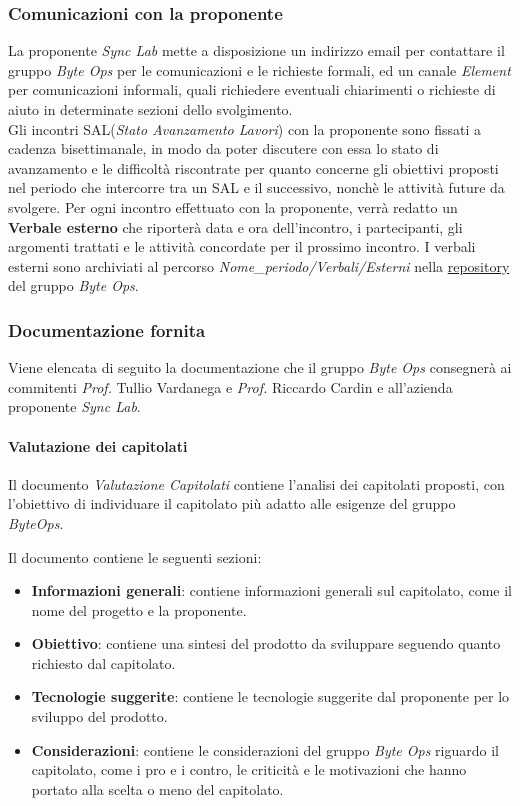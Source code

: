 \subsubsection{Comunicazioni con la proponente}
La proponente \textit{Sync Lab} mette a disposizione un indirizzo email per contattare il gruppo \textit{Byte Ops} per le comunicazioni e le richieste formali, ed un canale \textit{Element} per comunicazioni informali, quali richiedere eventuali chiarimenti o richieste di aiuto in determinate sezioni dello svolgimento.\\
Gli incontri SAL(\textit{Stato Avanzamento Lavori}) con la proponente sono fissati a cadenza bisettimanale, in modo da poter discutere con essa lo stato di avanzamento e le difficoltà riscontrate per quanto concerne gli obiettivi proposti nel periodo che intercorre tra un SAL e il successivo, nonchè le attività future da svolgere.
Per ogni incontro effettuato con la proponente, verrà redatto un \textbf{Verbale esterno} che riporterà data e ora dell'incontro, i partecipanti, gli argomenti trattati e le attività concordate per il prossimo incontro.
I verbali esterni sono archiviati al percorso \textit{Nome\_periodo/Verbali/Esterni} nella \href{https://github.com/ByteOps-swe/Documents}{repository} del gruppo \textit{Byte Ops}.

\subsubsection {Documentazione fornita}
Viene elencata di seguito la documentazione che il gruppo \textit{Byte Ops} consegnerà ai commitenti \textit{Prof.} Tullio Vardanega e \textit{Prof.} Riccardo Cardin e all'azienda proponente \textit{Sync Lab}.

\paragraph{Valutazione dei capitolati}
Il documento \textit{Valutazione Capitolati} contiene l'analisi dei capitolati proposti, con l'obiettivo di individuare il capitolato più adatto alle esigenze del gruppo \textit{ByteOps}.

Il documento contiene le seguenti sezioni:
\begin{itemize}
    \item \textbf{Informazioni generali}: contiene informazioni generali sul capitolato, come il nome del progetto e la proponente.
    \item \textbf{Obiettivo}: contiene una sintesi del prodotto da sviluppare seguendo quanto richiesto dal capitolato.
    \item \textbf{Tecnologie suggerite}: contiene le tecnologie suggerite dal proponente per lo sviluppo del prodotto.
    \item \textbf{Considerazioni}: contiene le considerazioni del gruppo \textit{Byte Ops} riguardo il capitolato, come i pro e i contro, le criticità e le motivazioni che hanno portato alla scelta o meno del capitolato.
\end{itemize}

